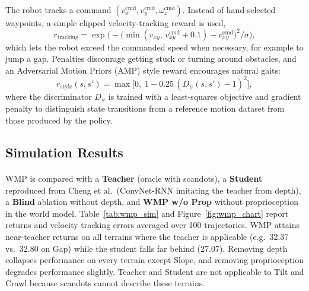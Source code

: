 \documentclass[12pt,a4paper,final]{extreport}
\begin{document}
\paragraph{} The robot tracks a command $(v^{\mathrm{cmd}}_x,v^{\mathrm{cmd}}_y,\omega^{\mathrm{cmd}}_z)$. Instead of hand-selected waypoints, a simple clipped velocity-tracking reward is used,
\begin{equation}
r_{\mathrm{tracking}}=\exp\!\Big(-\big(\min(v_{xy},\,v^{\mathrm{cmd}}_{xy}+0.1)-v^{\mathrm{cmd}}_{xy}\big)^2/\sigma\Big),
\end{equation}
which lets the robot exceed the commanded speed when necessary, for example to jump a gap. Penalties discourage getting stuck or turning around obstacles, and an Adversarial Motion Priors (AMP) style reward encourages natural gaits:
\begin{equation}
r_{\mathrm{style}}(s,s')=\max\!\big[0,\;1-0.25\,(D_\psi(s,s')-1)^2\big],
\end{equation}
where the discriminator $D_\psi$ is trained with a least-squares objective and gradient penalty to distinguish state transitions from a reference motion dataset from those produced by the policy.

\subsection{Simulation Results}

\paragraph{} WMP is compared with a \textbf{Teacher} (oracle with scandots), a \textbf{Student} reproduced from Cheng et al.\ (ConvNet-RNN imitating the teacher from depth), a \textbf{Blind} ablation without depth, and \textbf{WMP w/o Prop} without proprioception in the world model. Table~\ref{tab:wmp_sim} and Figure~\ref{fig:wmp_chart} report returns and velocity tracking errors averaged over 100 trajectories. WMP attains near-teacher returns on all terrains where the teacher is applicable (e.g.\ 32.37 vs.\ 32.80 on Gap) while the student falls far behind (27.07). Removing depth collapses performance on every terrain except Slope, and removing proprioception degrades performance slightly. Teacher and Student are not applicable to Tilt and Crawl because scandots cannot describe these terrains.
\end{document}
